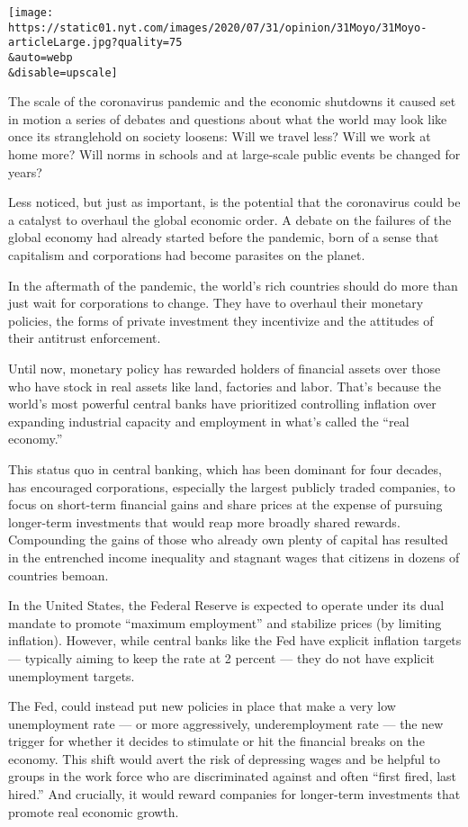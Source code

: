 \texttt{[image: https://static01.nyt.com/images/2020/07/31/opinion/31Moyo/31Moyo-articleLarge.jpg?quality=75\\\&auto=webp\\\&disable=upscale]}

The scale of the coronavirus pandemic and the economic shutdowns it
caused set in motion a series of debates and questions about what the
world may look like once its stranglehold on society loosens: Will we
travel less? Will we work at home more? Will norms in schools and at
large-scale public events be changed for years?

Less noticed, but just as important, is the potential that the
coronavirus could be a catalyst to overhaul the global economic order. A
debate on the failures of the global economy had already started before
the pandemic, born of a sense that capitalism and corporations had
become parasites on the planet.

In the aftermath of the pandemic, the world's rich countries should do
more than just wait for corporations to change. They have to overhaul
their monetary policies, the forms of private investment they
incentivize and the attitudes of their antitrust enforcement.

Until now, monetary policy has rewarded holders of financial assets over
those who have stock in real assets like land, factories and labor.
That's because the world's most powerful central banks have prioritized
controlling inflation over expanding industrial capacity and employment
in what's called the ``real economy.''

This status quo in central banking, which has been dominant for four
decades, has encouraged corporations, especially the largest publicly
traded companies, to focus on short-term financial gains and share
prices at the expense of pursuing longer-term investments that would
reap more broadly shared rewards. Compounding the gains of those who
already own plenty of capital has resulted in the entrenched income
inequality and stagnant wages that citizens in dozens of countries
bemoan.

In the United States, the Federal Reserve is expected to operate under
its dual mandate to promote ``maximum employment'' and stabilize prices
(by limiting inflation). However, while central banks like the Fed have
explicit inflation targets --- typically aiming to keep the rate at 2
percent --- they do not have explicit unemployment targets.

The Fed, could instead put new policies in place that make a very low
unemployment rate --- or more aggressively, underemployment rate --- the
new trigger for whether it decides to stimulate or hit the financial
breaks on the economy. This shift would avert the risk of depressing
wages and be helpful to groups in the work force who are discriminated
against and often ``first fired, last hired.'' And crucially, it would
reward companies for longer-term investments that promote real economic
growth.

